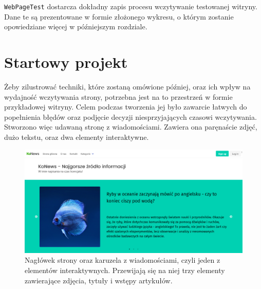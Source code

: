 \documentclass[licencjacka]{pracadypl}
\begin{document}
\texttt{WebPageTest} dostarcza dokładny zapis procesu wczytywanie testowanej witryny. Dane te są prezentowane w formie złożonego wykresu, o którym zostanie opowiedziane więcej w późniejszym rozdziale.


\section{Startowy projekt}
Żeby zilustrować techniki, które zostaną omówione później, oraz ich wpływ na wydajność wczytywania strony, potrzebna jest na to przestrzeń w formie przykładowej witryny. Celem podczas tworzenia jej było zawarcie łatwych do popełnienia błędów oraz podjęcie decyzji niesprzyjających czasowi wczytywania. Stworzono więc udawaną stronę z wiadomościami. Zawiera ona paręnaście zdjęć, dużo tekstu, oraz dwa elementy interaktywne. 

\begin{figure}[H]
  \includegraphics[width=\linewidth]{images/frontpage.png}
  \caption{Nagłówek strony oraz karuzela z wiadomościami, czyli jeden z elementów interaktywnych. Przewijają się na niej trzy elementy zawierające zdjęcia, tytuły i wstępy artykułów.}
  \label{fig:frontpage}
\end{figure}
\end{document}
